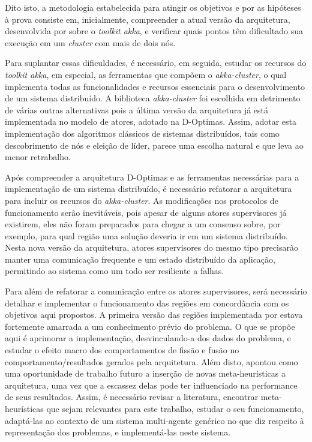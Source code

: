 Dito isto, a metodologia estabelecida para atingir os objetivos e por as hipóteses à prova consiste em, inicialmente, compreender a atual versão da arquitetura, desenvolvida por  sobre o \textit{toolkit akka}, e verificar quais pontos têm dificultado sua execução em um \textit{cluster} com mais de dois nós. 

Para suplantar essas dificuldades, é necessário, em seguida, estudar os recursos do \textit{toolkit akka}, em especial, as ferramentas que compõem o \textit{akka-cluster}, o qual implementa todas as funcionalidades e recursos essenciais para o desenvolvimento de um sistema distribuído. A biblioteca \textit{akka-cluster} foi escolhida em detrimento de várias outras alternativas pois a última versão da arquitetura já está implementada no modelo de atores, adotado na D-Optimas. Assim, adotar esta implementação dos algoritmos clássicos de sistemas distribuídos, tais como descobrimento de nós e eleição de líder, parece uma escolha natural e que leva ao menor retrabalho.

Após compreender a arquitetura D-Optimas e as ferramentas necessárias para a implementação de um sistema distribuído, é necessário refatorar a arquitetura para incluir os recursos do \textit{akka-cluster}. As modificações nos protocolos de funcionamento serão inevitáveis, pois apesar de alguns atores supervisores já existirem, eles não foram preparados para chegar a um consenso sobre, por exemplo, para qual região uma solução deveria ir em um sistema distribuído. Nesta nova versão da arquitetura, atores supervisores do mesmo tipo precisarão manter uma comunicação frequente e um estado distribuído da aplicação, permitindo ao sistema como um todo ser resiliente a falhas.

Para além de refatorar a comunicação entre os atores supervisores, será necessário detalhar e implementar o funcionamento das regiões em concordância com os objetivos aqui propostos. A primeira versão das regiões implementada por  estava fortemente amarrada a um conhecimento prévio do problema. O que se propõe aqui é aprimorar a implementação, desvinculando-a dos dados do problema, e estudar o efeito macro dos comportamentos de fissão e fusão no comportamento/resultados gerados pela arquitetura. Além disto,  apontou como uma oportunidade de trabalho futuro a inserção de novas meta-heurísticas a arquitetura, uma vez que a escassez delas pode ter influenciado na performance de seus resultados. Assim, é necessário revisar a literatura, encontrar meta-heurísticas que sejam relevantes para este trabalho, estudar o seu funcionamento, adaptá-las ao contexto de um sistema multi-agente genérico no que diz respeito à representação dos problemas, e implementá-las neste sistema.

